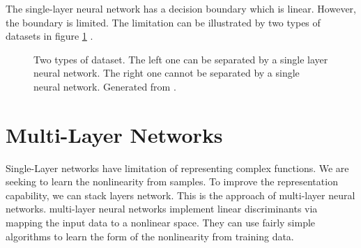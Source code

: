 The single-layer neural network has a decision boundary which is linear. However, the boundary is limited. The limitation can be illustrated by two types of datasets in figure \ref{fig:1Layer2datasets} .
\graphicspath{ {./Figures/} }
\begin{figure}[!htb]
\centering     %
{}
\caption{\label{fig:1Layer2datasets}Two types of dataset. The left one can be separated by a single layer neural network. The right one cannot be separated by a single neural network. Generated from \citep{GenerateNN}.}
\end{figure}

\section{Multi-Layer Networks}

Single-Layer networks have limitation of representing complex functions. We are seeking to learn the nonlinearity from samples. To improve the representation capability, we can stack layers network. This is the approach of multi-layer neural networks. multi-layer neural networks implement linear discriminants via mapping the input data to a nonlinear space. They can use fairly simple algorithms to learn the form of the nonlinearity from training data.

